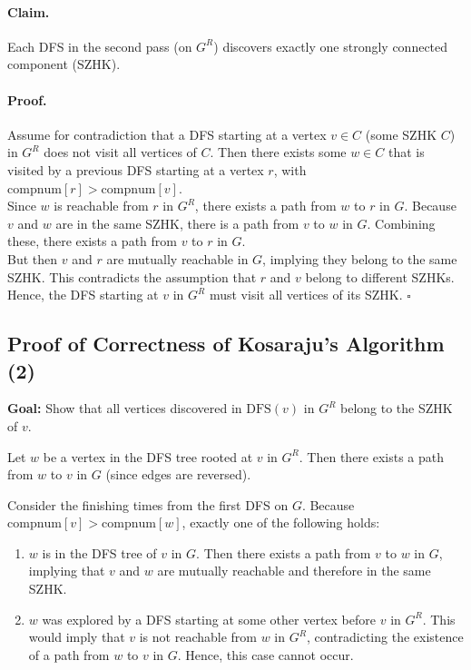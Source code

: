 \documentclass{article}
\begin{document}
\paragraph{Claim.} Each DFS in the second pass (on $G^R$) discovers exactly one strongly connected component (SZHK).

\paragraph{Proof.} 
Assume for contradiction that a DFS starting at a vertex $v \in C$ (some SZHK $C$) in $G^R$ does not visit all vertices of $C$.  
Then there exists some $w \in C$ that is visited by a previous DFS starting at a vertex $r$, with $\text{compnum}[r] > \text{compnum}[v]$.\\

Since $w$ is reachable from $r$ in $G^R$, there exists a path from $w$ to $r$ in $G$.  
Because $v$ and $w$ are in the same SZHK, there is a path from $v$ to $w$ in $G$.  
Combining these, there exists a path from $v$ to $r$ in $G$.\\

But then $v$ and $r$ are mutually reachable in $G$, implying they belong to the same SZHK.  
This contradicts the assumption that $r$ and $v$ belong to different SZHKs.\\

Hence, the DFS starting at $v$ in $G^R$ must visit all vertices of its SZHK. \hfill $\square$

\subsection{Proof of Correctness of Kosaraju's Algorithm (2)}
\textbf{Goal:} Show that all vertices discovered in $\text{DFS}(v)$ in $G^R$ belong to the SZHK of $v$.

Let $w$ be a vertex in the DFS tree rooted at $v$ in $G^R$.  
Then there exists a path from $w$ to $v$ in $G$ (since edges are reversed).

Consider the finishing times from the first DFS on $G$. Because $\text{compnum}[v] > \text{compnum}[w]$, exactly one of the following holds:

\begin{enumerate}
    \item $w$ is in the DFS tree of $v$ in $G$.  
    Then there exists a path from $v$ to $w$ in $G$, implying that $v$ and $w$ are mutually reachable and therefore in the same SZHK.
    \item $w$ was explored by a DFS starting at some other vertex before $v$ in $G^R$.  
    This would imply that $v$ is not reachable from $w$ in $G^R$, contradicting the existence of a path from $w$ to $v$ in $G$.  
    Hence, this case cannot occur.
\end{enumerate}
\end{document}

